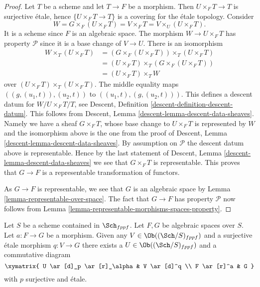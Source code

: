 \begin{proof}
Let $T$ be a scheme and let $T \to F$ be a morphism. Then
$U \times_F T \to T$ is surjective \'etale, hence $\{U \times_F T \to T\}$ is
a covering for the \'etale topology. Consider
$$
W = G \times_F (U \times_F T) = V \times_F T = V \times_U (U \times_F T).
$$
It is a scheme since $F$ is an algebraic space. The morphism
$W \to U \times_F T$ has property $\mathcal{P}$ since it is a
base change of $V \to U$. There is an isomorphism
\begin{align*}
W \times_T (U \times_F T) & =
(G \times_F (U \times_F T)) \times_T (U \times_F T) \\
& = (U \times_F T) \times_T (G \times_F (U \times_F T)) \\
& = (U \times_F T) \times_T W
\end{align*}
over $(U \times_F T) \times_T (U \times_F T)$. The middle equality maps
$((g, (u_1, t)), (u_2, t))$ to $((u_1, t), (g, (u_2, t)))$.
This defines a descent datum for $W/U \times_F T/T$, see
Descent, Definition \ref{descent-definition-descent-datum}.
This follows from
Descent, Lemma \ref{descent-lemma-descent-data-sheaves}.
Namely we have a sheaf $G \times_F T$, whose
base change to $U \times_F T$ is represented by $W$ and the isomorphism
above is the one from the proof of
Descent, Lemma \ref{descent-lemma-descent-data-sheaves}.
By assumption on $\mathcal{P}$ the descent datum above is representable.
Hence by the last statement of
Descent, Lemma \ref{descent-lemma-descent-data-sheaves}
we see that $G \times_F T$ is representable. This proves that
$G \to F$ is a representable transformation of functors.

\medskip\noindent
As $G \to F$ is representable, we see that $G$ is an algebraic space by
Lemma \ref{lemma-representable-over-space}. The fact that $G \to F$ has
property $\mathcal{P}$ now follows from
Lemma \ref{lemma-representable-morphisms-spaces-property}.
\end{proof}

\begin{lemma}
\label{lemma-lift-morphism-presentations}
Let $S$ be a scheme contained in $\Sch_{fppf}$.
Let $F, G$ be algebraic spaces over $S$.
Let $a : F \to G$ be a morphism.
Given any $V \in \Ob((\Sch/S)_{fppf})$
and a surjective \'etale morphism $q : V \to G$ there exists
a $U \in \Ob((\Sch/S)_{fppf})$
and a commutative diagram
$$
\xymatrix{
U \ar[d]_p \ar[r]_\alpha &
V \ar[d]^q \\
F \ar[r]^a & G
}
$$
with $p$ surjective and \'etale.
\end{lemma}

